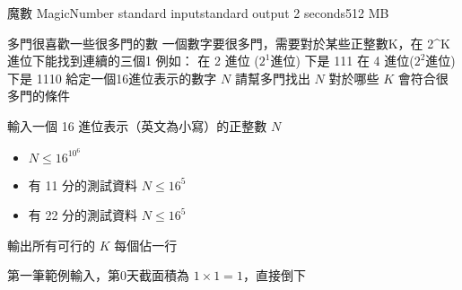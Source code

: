 \gdef\thisproblemauthor{}
\gdef\thisproblemdeveloper{}
\gdef\thisproblemorigin{}
\begin{problem}{魔數 MagicNumber}
{standard input}{standard output}
{2 seconds}{512 MB}{}

多門很喜歡一些很多門的數\newline
一個數字要很多門，需要對於某些正整數K，在 2^K 進位下能找到連續的三個1\newline
\newline
例如： 在 2 進位 ($2^1$進位) 下是 111 在 4 進位($2^2$進位) 下是 1110\newline
\newline
給定一個16進位表示的數字 $N$\newline
請幫多門找出 $N$ 對於哪些 $K$ 會符合很多門的條件\newline

\InputFile

輸入一個 16 進位表示（英文為小寫）的正整數 $N$
\begin{iofmt}
\begin{itemize}
	\item $N \leq 16^{10^6}$
	\item 有 11 分的測試資料 $N \leq 16^5$
	\item 有 22 分的測試資料 $N \leq 16^5$
\end{itemize}
\end{iofmt}

\OutputFile

輸出所有可行的 $K$ \newline
每個佔一行

\Examples

\begin{example}
%
%
%
\end{example}

第一筆範例輸入，第0天截面積為 $1 \times 1 = 1$，直接倒下

\end{problem}

